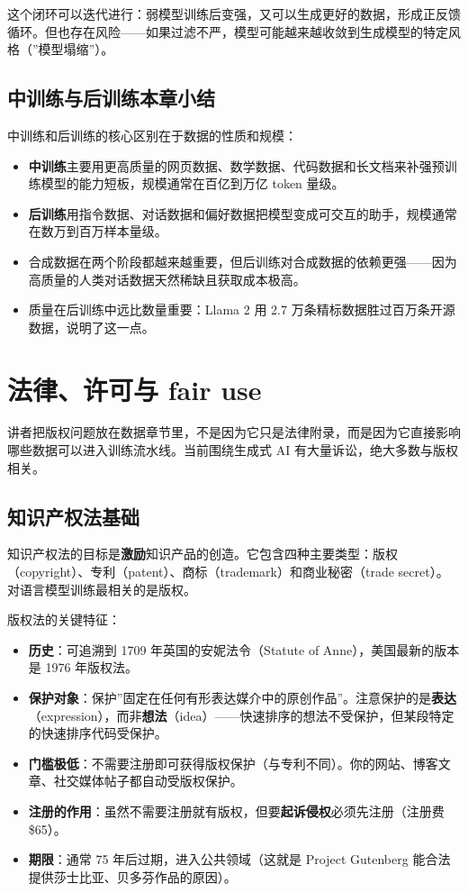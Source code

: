 \documentclass[a4paper]{article}
\begin{document}
这个闭环可以迭代进行：弱模型训练后变强，又可以生成更好的数据，形成正反馈循环。但也存在风险——如果过滤不严，模型可能越来越收敛到生成模型的特定风格（”模型塌缩”）。

\subsection{中训练与后训练本章小结}

中训练和后训练的核心区别在于数据的性质和规模：
\begin{itemize}
    \item \textbf{中训练}主要用更高质量的网页数据、数学数据、代码数据和长文档来补强预训练模型的能力短板，规模通常在百亿到万亿 token 量级。
    \item \textbf{后训练}用指令数据、对话数据和偏好数据把模型变成可交互的助手，规模通常在数万到百万样本量级。
    \item 合成数据在两个阶段都越来越重要，但后训练对合成数据的依赖更强——因为高质量的人类对话数据天然稀缺且获取成本极高。
    \item 质量在后训练中远比数量重要：Llama 2 用 2.7 万条精标数据胜过百万条开源数据，说明了这一点。
\end{itemize}

\section{法律、许可与 fair use}

讲者把版权问题放在数据章节里，不是因为它只是法律附录，而是因为它直接影响哪些数据可以进入训练流水线。当前围绕生成式 AI 有大量诉讼，绝大多数与版权相关。

\subsection{知识产权法基础}

知识产权法的目标是\textbf{激励}知识产品的创造。它包含四种主要类型：版权（copyright）、专利（patent）、商标（trademark）和商业秘密（trade secret）。对语言模型训练最相关的是版权。

版权法的关键特征：
\begin{itemize}
    \item \textbf{历史}：可追溯到 1709 年英国的安妮法令（Statute of Anne），美国最新的版本是 1976 年版权法。
    \item \textbf{保护对象}：保护”固定在任何有形表达媒介中的原创作品”。注意保护的是\textbf{表达}（expression），而非\textbf{想法}（idea）——快速排序的想法不受保护，但某段特定的快速排序代码受保护。
    \item \textbf{门槛极低}：不需要注册即可获得版权保护（与专利不同）。你的网站、博客文章、社交媒体帖子都自动受版权保护。
    \item \textbf{注册的作用}：虽然不需要注册就有版权，但要\textbf{起诉侵权}必须先注册（注册费 \$65）。
    \item \textbf{期限}：通常 75 年后过期，进入公共领域（这就是 Project Gutenberg 能合法提供莎士比亚、贝多芬作品的原因）。
\end{itemize}
\end{document}
